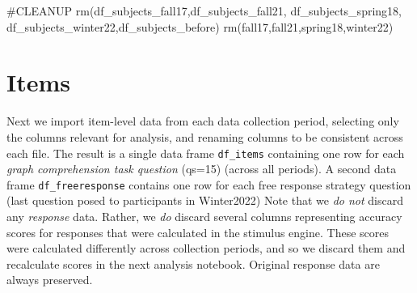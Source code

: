 \documentclass[
  letterpaper,
  DIV=11,
  numbers=noendperiod]{scrreprt}
\newenvironment{Shaded}{\begin{snugshade}}{\end{snugshade}}
\newcommand{\CommentTok}[1]{\textcolor[rgb]{0.37,0.37,0.37}{#1}}
\newcommand{\FunctionTok}[1]{\textcolor[rgb]{0.28,0.35,0.67}{#1}}
\newcommand{\NormalTok}[1]{\textcolor[rgb]{0.00,0.23,0.31}{#1}}
\begin{document}
\begin{Shaded}
\begin{Highlighting}[]
\CommentTok{\#CLEANUP}
\FunctionTok{rm}\NormalTok{(df\_subjects\_fall17,df\_subjects\_fall21, df\_subjects\_spring18, df\_subjects\_winter22,df\_subjects\_before)}
\FunctionTok{rm}\NormalTok{(fall17,fall21,spring18,winter22)}
\end{Highlighting}
\end{Shaded}

\hypertarget{items}{%
\section{Items}\label{items}}

Next we import item-level data from each data collection period,
selecting only the columns relevant for analysis, and renaming columns
to be consistent across each file. The result is a single data frame
\texttt{df\_items} containing one row for each \emph{graph comprehension
task question} (qs=15) (across all periods). A second data frame
\texttt{df\_freeresponse} contains one row for each free response
strategy question (last question posed to participants in Winter2022)
Note that we \emph{do not} discard any \emph{response} data. Rather, we
\emph{do} discard several columns representing accuracy scores for
responses that were calculated in the stimulus engine. These scores were
calculated differently across collection periods, and so we discard them
and recalculate scores in the next analysis notebook. Original response
data are always preserved.
\end{document}
